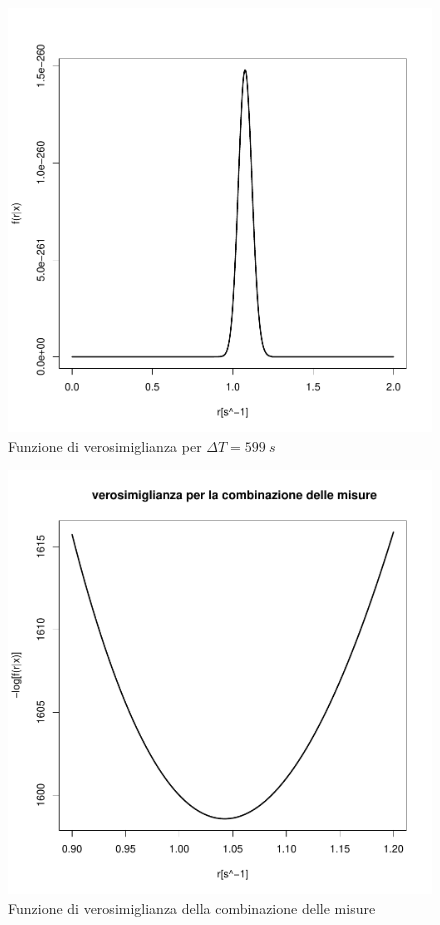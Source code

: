 \documentclass[10pt,oneside,a4paper]{article}
\begin{document}
\begin{figure}
\caption{Funzione di verosimiglianza per $\Delta T = \SI{599}{s}$}
\label{fig:verosimiglianza600sec}
\centering
\includegraphics[scale=0.5]{verosimiglianza600sec_nuovo.pdf}
\end{figure}

\begin{figure}
\caption{Funzione di verosimiglianza della combinazione delle misure}
\label{fig:verosimiglianzacombinata}
\centering
\includegraphics[scale=0.5]{verosimiglianza_comb.pdf}
\end{figure}
\end{document}

